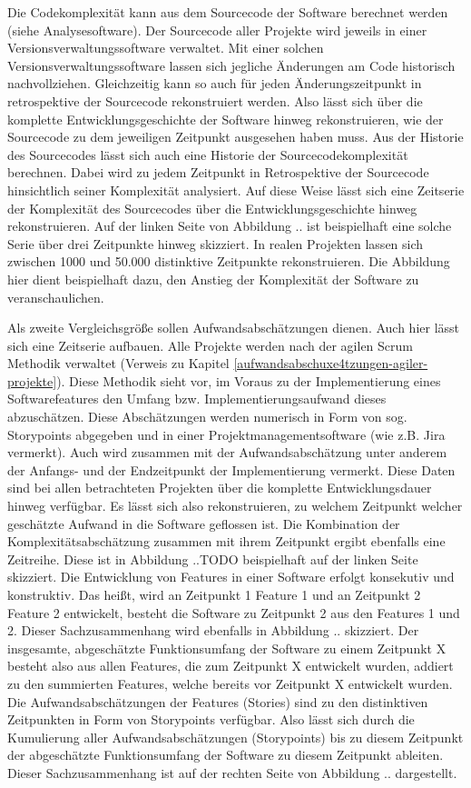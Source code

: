 Die Codekomplexität kann aus dem Sourcecode der Software berechnet
werden (siehe Analysesoftware). Der Sourcecode aller Projekte wird
jeweils in einer Versionsverwaltungssoftware verwaltet. Mit einer
solchen Versionsverwaltungssoftware lassen sich jegliche Änderungen am
Code historisch nachvollziehen. Gleichzeitig kann so auch für jeden
Änderungszeitpunkt in retrospektive der Sourcecode rekonstruiert
werden. Also lässt sich über die komplette
Entwicklungsgeschichte der Software hinweg rekonstruieren, wie der
Sourcecode zu dem jeweiligen Zeitpunkt ausgesehen haben muss. Aus der
Historie des Sourcecodes lässt sich auch eine Historie der
Sourcecodekomplexität berechnen. Dabei wird zu jedem Zeitpunkt in
Retrospektive der Sourcecode hinsichtlich seiner Komplexität analysiert.
Auf diese Weise lässt sich eine Zeitserie der Komplexität des
Sourcecodes über die Entwicklungsgeschichte hinweg rekonstruieren. Auf
der linken Seite von Abbildung .. ist beispielhaft eine solche Serie
über drei Zeitpunkte hinweg skizziert. In realen Projekten lassen sich
zwischen 1000 und 50.000 distinktive Zeitpunkte rekonstruieren. Die
Abbildung hier dient beispielhaft dazu, den Anstieg der Komplexität der
Software zu veranschaulichen.

Als zweite Vergleichsgröße sollen Aufwandsabschätzungen dienen. Auch
hier lässt sich eine Zeitserie aufbauen. Alle Projekte werden nach der
agilen Scrum Methodik verwaltet (Verweis zu Kapitel \ref{aufwandsabschuxe4tzungen-agiler-projekte}). Diese Methodik
sieht vor, im Voraus zu der Implementierung eines Softwarefeatures den
Umfang bzw. Implementierungsaufwand dieses abzuschätzen. Diese
Abschätzungen werden numerisch in Form von sog. Storypoints abgegeben
und in einer Projektmanagementsoftware (wie z.B. Jira vermerkt). Auch
wird zusammen mit der Aufwandsabschätzung unter anderem der Anfangs- und
der Endzeitpunkt der Implementierung vermerkt. Diese Daten sind bei
allen betrachteten Projekten über die komplette Entwicklungsdauer hinweg
verfügbar. Es lässt sich also rekonstruieren, zu welchem Zeitpunkt
welcher geschätzte Aufwand in die Software geflossen ist. Die
Kombination der Komplexitätsabschätzung zusammen mit ihrem Zeitpunkt
ergibt ebenfalls eine Zeitreihe. Diese ist in Abbildung ..TODO beispielhaft
auf der linken Seite skizziert. Die Entwicklung von Features in einer
Software erfolgt konsekutiv und konstruktiv. Das heißt, wird an
Zeitpunkt 1 Feature 1 und an Zeitpunkt 2 Feature 2 entwickelt, besteht
die Software zu Zeitpunkt 2 aus den Features 1 und 2. Dieser
Sachzusammenhang wird ebenfalls in Abbildung .. skizziert. Der
insgesamte, abgeschätzte Funktionsumfang der Software zu einem Zeitpunkt
X besteht also aus allen Features, die zum Zeitpunkt X entwickelt
wurden, addiert zu den summierten Features, welche bereits vor Zeitpunkt
X entwickelt wurden. Die Aufwandsabschätzungen der Features (Stories)
sind zu den distinktiven Zeitpunkten in Form von Storypoints verfügbar.
Also lässt sich durch die Kumulierung aller Aufwandsabschätzungen
(Storypoints) bis zu diesem Zeitpunkt der abgeschätzte Funktionsumfang
der Software zu diesem Zeitpunkt ableiten. Dieser Sachzusammenhang ist
auf der rechten Seite von Abbildung .. dargestellt.

